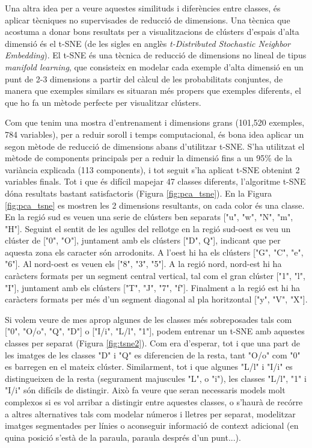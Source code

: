 \documentclass[12pt, spanish]{article}
\begin{document}
Una altra idea per a veure aquestes similituds i diferències entre classes, és aplicar tècniques no supervisades de reducció de dimensions. Una tècnica que acostuma a donar bons resultats per a visualitzacions de clústers d'espais d'alta dimensió és el t-SNE (de les sigles en anglès \textit{t-Distributed Stochastic Neighbor Embedding}). El t-SNE és una tècnica de reducció de dimensions no lineal de tipus \textit{manifold learning}, que consisteix en modelar cada exemple d'alta dimensió en un punt de 2-3 dimensions a partir del càlcul de les probabilitats conjuntes, de manera que exemples similars es situaran més propers que exemples diferents, el que ho fa un mètode perfecte per visualitzar clústers.

Com que tenim una mostra d'entrenament i dimensions grans (101,520 exemples, 784 variables), per a reduir soroll i temps computacional, és bona idea aplicar un segon mètode de reducció de dimensions abans d'utilitzar t-SNE. S'ha utilitzat el mètode de components principals per a reduir la dimensió fins a un 95\% de la variància explicada (113 components), i tot seguit s'ha aplicat t-SNE obtenint 2 variables finals. Tot i que és difícil mapejar 47 classes diferents, l'algoritme t-SNE dóna resultats bastant satisfactoris (Figura \ref{fig:pca_tsne}). En la Figura \ref{fig:pca_tsne} es mostren les 2 dimensions resultants, on cada color és una classe. En la regió sud es veuen una serie de clústers ben separats ["u", "w", "N", "m", "H"]. Seguint el sentit de les agulles del rellotge en la regió sud-oest es veu un clúster de ["0", "O"], juntament amb els clústers ["D", Q"], indicant que per aquesta zona els caracter són arrodonits. A l'oest hi ha els clústers ["G", "C", "e", "6"]. Al nord-oest es veuen els ["8", "3", "5"]. A la regió nord, nord-est hi ha caràcters formats per un segment central vertical, tal com el gran clúster ["1", "l", "I"], juntament amb els clústers ["T", "J", "7", "f"]. Finalment a la regió est hi ha caràcters formats per més d'un segment diagonal al pla horitzontal ["y", "V", "X"]. 

Si volem veure de mes aprop algunes de les classes més sobreposades tals com ["0", "O/o", "Q", "D"] o ["I/i", "L/l", "1"], podem entrenar un t-SNE amb aquestes classes per separat (Figura \ref{fig:tsne2}). Com era d'esperar, tot i que una part de les imatges de les classes "D" i "Q" es diferencien de la resta, tant "O/o" com "0" es barregen en el mateix clúster. Similarment, tot i que algunes "L/l" i "I/i" es distingueixen de la resta (segurament majuscules "L", o "i"), les classes "L/l", "1" i "I/i" són difícils de distingir. Això fa veure que seran necessaris models molt complexos si es vol arribar a distingir entre aquestes classes, o s'haurà de recórre a altres alternatives tals com modelar números i lletres per separat, modelitzar imatges segmentades per línies o aconseguir informació de context adicional (en quina posició s'està de la paraula, paraula després d'un punt...).
\end{document}

